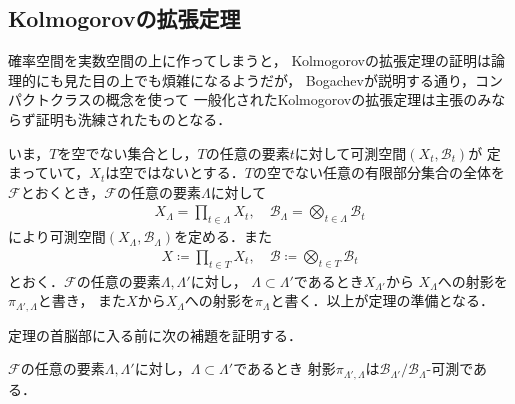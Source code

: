 \subsection{Kolmogorovの拡張定理}
	確率空間を実数空間の上に作ってしまうと，
	Kolmogorovの拡張定理の証明は論理的にも見た目の上でも煩雑になるようだが，
	Bogachevが説明する通り，コンパクトクラスの概念を使って
	一般化されたKolmogorovの拡張定理は主張のみならず証明も洗練されたものとなる．
	
	いま，$T$を空でない集合とし，$T$の任意の要素$t$に対して可測空間$(X_t,\mathscr{B}_t)$が
	定まっていて，$X_t$は空ではないとする．$T$の空でない任意の有限部分集合の全体を
	$\mathscr{F}$とおくとき，$\mathscr{F}$の任意の要素$\Lambda$に対して
	\begin{align}
		X_\Lambda = \prod_{t \in \Lambda} X_t,
		\quad \mathscr{B}_\Lambda = \bigotimes_{t \in \Lambda} \mathscr{B}_t
	\end{align}
	により可測空間$(X_\Lambda,\mathscr{B}_\Lambda)$を定める．また
	\begin{align}
		X \coloneqq \prod_{t \in T} X_t,
		\quad \mathscr{B} \coloneqq \bigotimes_{t \in T} \mathscr{B}_t
	\end{align}
	とおく．$\mathscr{F}$の任意の要素$\Lambda,\Lambda'$に対し，
	$\Lambda \subset \Lambda'$であるとき$X_{\Lambda'}$から
	$X_{\Lambda}$への射影を$\pi_{\Lambda',\Lambda}$と書き，
	また$X$から$X_\Lambda$への射影を$\pi_{\Lambda}$と書く．以上が定理の準備となる．
	
	定理の首脳部に入る前に次の補題を証明する．
	\begin{screen}
		\begin{lem}[射影の可測性]\label{lem:Kolmogorov_extension_theorem}
			$\mathscr{F}$の任意の要素$\Lambda,\Lambda'$に対し，$\Lambda \subset \Lambda'$であるとき
			射影$\pi_{\Lambda',\Lambda}$は$\mathscr{B}_{\Lambda'}/\mathscr{B}_\Lambda$-可測である．
		\end{lem}
	\end{screen}
	
	\begin{prf}
		
	\end{prf}
	
